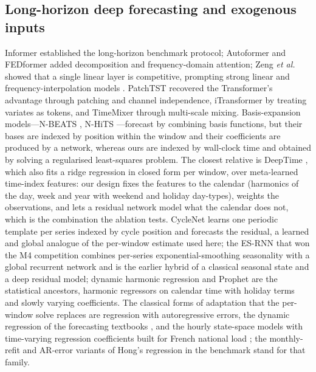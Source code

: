 \subsection{Long-horizon deep forecasting and exogenous inputs}
Informer \cite{zhou2021informer} established the long-horizon benchmark protocol; Autoformer
\cite{wu2021autoformer} and FEDformer \cite{zhou2022fedformer} added decomposition and
frequency-domain attention; Zeng \emph{et al.} \cite{zeng2023dlinear} showed that a single
linear layer is competitive, prompting strong linear and frequency-interpolation models
\cite{li2023rlinear,xu2024fits}. PatchTST \cite{nie2023patchtst} recovered the Transformer's
advantage through patching and channel independence, iTransformer \cite{liu2024itransformer}
by treating variates as tokens, and TimeMixer \cite{wang2024timemixer} through multi-scale
mixing. Basis-expansion models---N-BEATS \cite{oreshkin2020nbeats}, N-HiTS
\cite{challu2023nhits}---forecast by combining basis functions, but their bases are indexed by
position within the window and their coefficients are produced by a network, whereas ours are
indexed by wall-clock time and obtained by solving a regularised least-squares problem. The
closest relative is DeepTime \cite{woo2023deeptime}, which also fits a ridge regression in
closed form per window, over meta-learned time-index features: our design fixes the features
to the calendar (harmonics of the day, week and year with weekend and holiday day-types),
weights the observations, and lets a residual network model what the calendar does not,
which is the combination the ablation tests. CycleNet \cite{lin2024cyclenet} learns one
periodic template per series indexed by cycle position and forecasts the residual, a learned
and global analogue of the per-window estimate used here; the ES-RNN that won the M4
competition \cite{smyl2020esrnn} combines per-series exponential-smoothing seasonality with a
global recurrent network and is the earlier hybrid of a classical seasonal state and a deep
residual model; dynamic harmonic regression \cite{young1999dhr} and Prophet
\cite{taylor2018prophet} are the statistical ancestors, harmonic regressors on calendar time
with holiday terms and slowly varying coefficients. The classical forms of adaptation that the
per-window solve replaces are regression with autoregressive errors, the dynamic regression of
the forecasting textbooks \cite{hyndman2021fpp3}, and the hourly state-space models with
time-varying regression coefficients built for French national load \cite{dordonnat2008load};
the monthly-refit and AR-error variants of Hong's regression in the benchmark stand for that
family.

